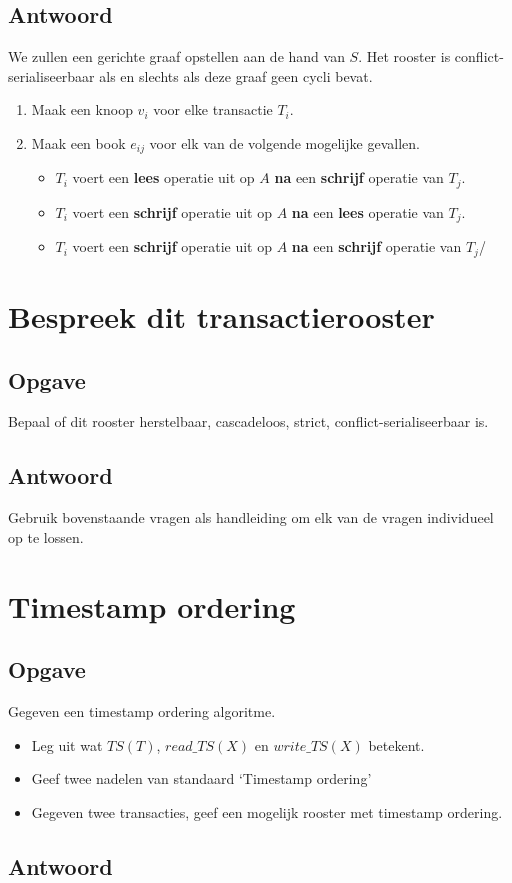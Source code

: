 \documentclass[transacties.tex]{subfiles}
\begin{document}
\subsection*{Antwoord}
We zullen een gerichte graaf opstellen aan de hand van $S$. Het rooster is conflict-serialiseerbaar als en slechts als deze graaf geen cycli bevat.
\begin{enumerate}
\item Maak een knoop $v_i$ voor elke transactie $T_i$.
\item Maak een book $e_{ij}$ voor elk van de volgende mogelijke gevallen.
\begin{itemize}
\item $T_i$ voert een \textbf{lees} operatie uit op $A$ \textbf{na} een \textbf{schrijf} operatie van $T_j$.
\item $T_i$ voert een \textbf{schrijf} operatie uit op $A$ \textbf{na} een \textbf{lees} operatie van $T_j$.
\item $T_i$ voert een \textbf{schrijf} operatie uit op $A$ \textbf{na} een \textbf{schrijf} operatie van $T_j$/
\end{itemize}
\end{enumerate}

\section{Bespreek dit transactierooster}
\subsection*{Opgave}
Bepaal of dit rooster herstelbaar, cascadeloos, strict, conflict-serialiseerbaar is.

\subsection*{Antwoord}
Gebruik bovenstaande vragen als handleiding om elk van de vragen individueel op te lossen.

\section{Timestamp ordering}
\subsection*{Opgave}
Gegeven een timestamp ordering algoritme.
\begin{itemize}
\item Leg uit wat $TS(T)$, $read\_TS(X)$ en $write\_TS(X)$ betekent.
\item Geef twee nadelen van standaard `Timestamp ordering'
\item Gegeven twee transacties, geef een mogelijk rooster met timestamp ordering.
\end{itemize}
\subsection*{Antwoord}
\end{document}
